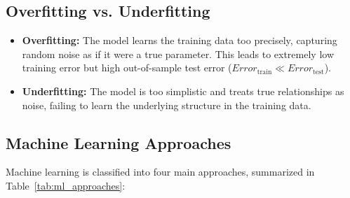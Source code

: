 \subsection{Overfitting vs. Underfitting}
\begin{itemize}[noitemsep, topsep=2pt, parsep=0pt]
	\item \textbf{Overfitting:} The model learns the training data too precisely, capturing random noise as if it were a true parameter. This leads to extremely low training error but high out-of-sample test error ($Error_{\text{train}} \ll Error_{\text{test}}$).
	\item \textbf{Underfitting:} The model is too simplistic and treats true relationships as noise, failing to learn the underlying structure in the training data.
\end{itemize}

\subsection{Machine Learning Approaches}
Machine learning is classified into four main approaches, summarized in Table~\ref{tab:ml_approaches}:

